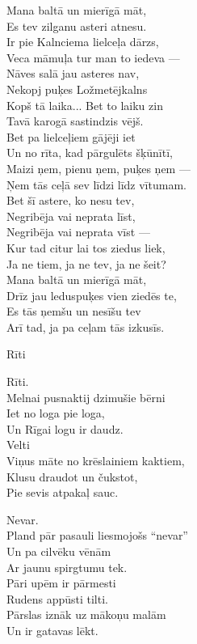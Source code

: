 \documentclass[14pt]{extarticle}
\begin{document}
Mana baltā un mierīgā māt,\\
Es tev zilganu asteri atnesu.\\
Ir pie Kalnciema lielceļa dārzs,\\
Veca māmuļa tur man to iedeva ---\\
Nāves salā jau asteres nav,\\
Nekopj puķes Ložmetējkalns\\
Kopš tā laika... Bet to laiku zin\\
Tavā karogā sastindzis vējš.\\
Bet pa lielceļiem gājēji iet\\
Un no rīta, kad pārgulēts šķūnītī,\\
Maizi ņem, pienu ņem, puķes ņem ---\\
Ņem tās ceļā sev līdzi līdz vītumam.\\
Bet šī astere, ko nesu tev,\\
Negribēja vai neprata līst,\\
Negribēja vai neprata vīst ---\\
Kur tad citur lai tos ziedus liek,\\
Ja ne tiem, ja ne tev, ja ne šeit?\\
Mana baltā un mierīgā māt,\\
Drīz jau leduspuķes vien ziedēs te,\\
Es tās ņemšu un nesīšu tev\\
Arī tad, ja pa ceļam tās izkusīs.


\newpage

{\large \sc Rīti}

Rīti.\\
Melnai pusnaktij dzimušie bērni\\
Iet no loga pie loga,\\
Un Rīgai logu ir daudz.\\
Velti\\
Viņus māte no krēslainiem kaktiem,\\
Klusu draudot un čukstot,\\
Pie sevis atpakaļ sauc.

Nevar.\\
Pland pār pasauli liesmojošs ``nevar''\\
Un pa cilvēku vēnām\\
Ar jaunu spirgtumu tek.\\
Pāri upēm ir pārmesti\\
Rudens appūsti tilti.\\
Pārslas iznāk uz mākoņu malām\\
Un ir gatavas lēkt.
\end{document}

